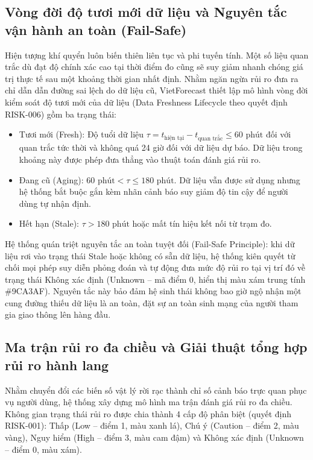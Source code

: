 \subsection{Vòng đời độ tươi mới dữ liệu và Nguyên tắc vận hành an toàn (Fail-Safe)}

Hiện tượng khí quyển luôn biến thiên liên tục và phi tuyến tính. Một số liệu quan trắc dù đạt độ chính xác cao tại thời điểm đo cũng sẽ suy giảm nhanh chóng giá trị thực tế sau một khoảng thời gian nhất định. Nhằm ngăn ngừa rủi ro đưa ra chỉ dẫn dẫn đường sai lệch do dữ liệu cũ, VietForecast thiết lập mô hình vòng đời kiểm soát độ tươi mới của dữ liệu (Data Freshness Lifecycle theo quyết định RISK-006) gồm ba trạng thái:
\begin{itemize}
    \item[-] Tươi mới (Fresh): Độ tuổi dữ liệu $\tau = t_{\text{hiện tại}} - t_{\text{quan trắc}} \le 60\text{ phút}$ đối với quan trắc tức thời và không quá 24 giờ đối với dữ liệu dự báo. Dữ liệu trong khoảng này được phép đưa thẳng vào thuật toán đánh giá rủi ro.
    \item[-] Đang cũ (Aging): $60\text{ phút} < \tau \le 180\text{ phút}$. Dữ liệu vẫn được sử dụng nhưng hệ thống bắt buộc gắn kèm nhãn cảnh báo suy giảm độ tin cậy để người dùng tự nhận định.
    \item[-] Hết hạn (Stale): $\tau > 180\text{ phút}$ hoặc mất tín hiệu kết nối từ trạm đo.
\end{itemize}

Hệ thống quán triệt nguyên tắc an toàn tuyệt đối (Fail-Safe Principle): khi dữ liệu rơi vào trạng thái Stale hoặc không có sẵn dữ liệu, hệ thống kiên quyết từ chối mọi phép suy diễn phỏng đoán và tự động đưa mức độ rủi ro tại vị trí đó về trạng thái Không xác định (Unknown -- mã điểm 0, hiển thị màu xám trung tính \#9CA3AF). Nguyên tắc này bảo đảm hệ sinh thái không bao giờ ngộ nhận một cung đường thiếu dữ liệu là an toàn, đặt sự an toàn sinh mạng của người tham gia giao thông lên hàng đầu.

\subsection{Ma trận rủi ro đa chiều và Giải thuật tổng hợp rủi ro hành lang}

Nhằm chuyển đổi các biến số vật lý rời rạc thành chỉ số cảnh báo trực quan phục vụ người dùng, hệ thống xây dựng mô hình ma trận đánh giá rủi ro đa chiều. Không gian trạng thái rủi ro được chia thành 4 cấp độ phân biệt (quyết định RISK-001): Thấp (Low -- điểm 1, màu xanh lá), Chú ý (Caution -- điểm 2, màu vàng), Nguy hiểm (High -- điểm 3, màu cam đậm) và Không xác định (Unknown -- điểm 0, màu xám).

